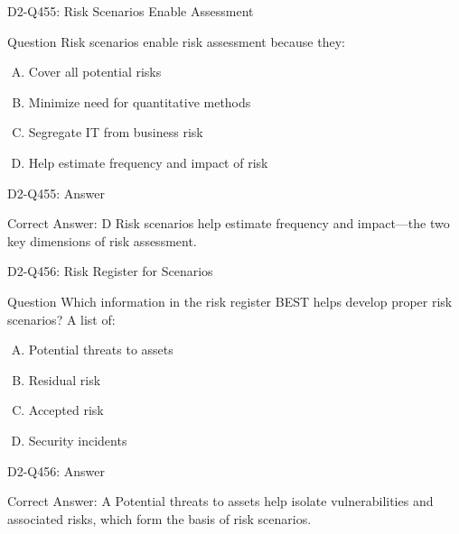 \documentclass{beamer}
\begin{document}
\begin{frame}{D2-Q455: Risk Scenarios Enable Assessment}
	\begin{block}{Question}
		Risk scenarios enable risk assessment because they:
	\end{block}
	\begin{enumerate}[(A)]
		\item Cover all potential risks
		\item Minimize need for quantitative methods
		\item Segregate IT from business risk
		\item Help estimate frequency and impact of risk
	\end{enumerate}
\end{frame}
\begin{frame}{D2-Q455: Answer}
	\begin{block}{Correct Answer: D}
		Risk scenarios help estimate frequency and impact—the two key dimensions of risk assessment.
	\end{block}
\end{frame}

\begin{frame}{D2-Q456: Risk Register for Scenarios}
	\begin{block}{Question}
		Which information in the risk register BEST helps develop proper risk scenarios? A list of:
	\end{block}
	\begin{enumerate}[(A)]
		\item Potential threats to assets
		\item Residual risk
		\item Accepted risk
		\item Security incidents
	\end{enumerate}
\end{frame}
\begin{frame}{D2-Q456: Answer}
	\begin{block}{Correct Answer: A}
		Potential threats to assets help isolate vulnerabilities and associated risks, which form the basis of risk scenarios.
	\end{block}
\end{frame}
\end{document}
